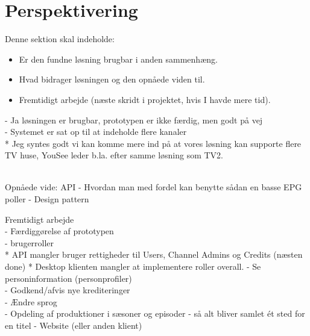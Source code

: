 \section{Perspektivering}
Denne sektion skal indeholde:

\begin{itemize}
    \item Er den fundne løsning brugbar i anden sammenhæng.
    \item Hvad bidrager løsningen og den opnåede viden til. 
    \item Fremtidigt arbejde (næste skridt i projektet, hvis I havde mere tid).
\end{itemize}{}


- Ja løsningen er brugbar, prototypen er ikke færdig, men godt på vej \\
- Systemet er sat op til at indeholde flere kanaler \\
    * Jeg syntes godt vi kan komme mere ind på at vores løsning kan supporte flere TV huse, YouSee leder b.la. efter samme løsning som TV2.

 \\
Opnåede vide:
    API - Hvordan man med fordel kan benytte sådan en basse
    EPG poller - 
    Design pattern
    

Fremtidigt arbejde \\
- Færdiggørelse af prototypen\\
    - brugerroller \\
        * API mangler bruger rettigheder til Users, Channel Admins og Credits (næsten done)
        * Desktop klienten mangler at implementere roller overall.
    - Se personinformation (personprofiler) \\
    - Godkend/afvis nye krediteringer \\
    - Ændre sprog \\
    - Opdeling af produktioner i sæsoner og episoder - så alt bliver samlet ét sted for en titel
- Website (eller anden klient)
